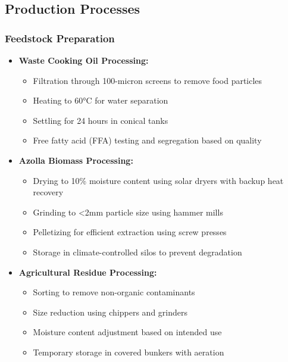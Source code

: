 \subsection{Production Processes}

\subsubsection{Feedstock Preparation}
\begin{itemize}
    \item \textbf{Waste Cooking Oil Processing:}
    \begin{itemize}
        \item Filtration through 100-micron screens to remove food particles
        \item Heating to 60°C for water separation
        \item Settling for 24 hours in conical tanks
        \item Free fatty acid (FFA) testing and segregation based on quality
    \end{itemize}
    
    \item \textbf{Azolla Biomass Processing:}
    \begin{itemize}
        \item Drying to 10\% moisture content using solar dryers with backup heat recovery
        \item Grinding to <2mm particle size using hammer mills
        \item Pelletizing for efficient extraction using screw presses
        \item Storage in climate-controlled silos to prevent degradation
    \end{itemize}
    
    \item \textbf{Agricultural Residue Processing:}
    \begin{itemize}
        \item Sorting to remove non-organic contaminants
        \item Size reduction using chippers and grinders
        \item Moisture content adjustment based on intended use
        \item Temporary storage in covered bunkers with aeration
    \end{itemize}
\end{itemize}

